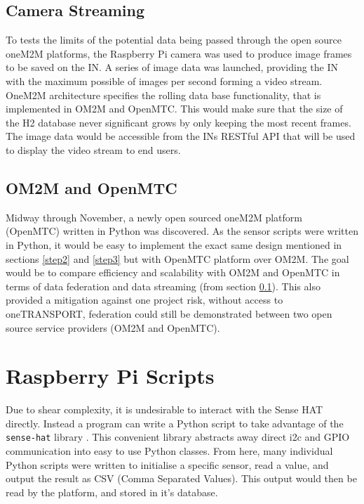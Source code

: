 \subsection{Camera Streaming}
\label{stream}

To tests the limits of the potential data being passed through the open source oneM2M platforms, the Raspberry Pi camera was used to produce image frames to be saved on the IN. A series of image data was launched, providing the IN with the maximum possible of images per second forming a video stream. OneM2M architecture specifies the rolling data base functionality, that is implemented in OM2M and OpenMTC. This would make sure that the size of the H2 database never significant grows by only keeping the most recent frames. The image data would be accessible from the INs RESTful API that will be used to display the video stream to end users.

\subsection{OM2M and OpenMTC}

Midway through November, a newly open sourced oneM2M platform (OpenMTC) written in Python was discovered. As the sensor scripts were written in Python, it would be easy to implement the exact same design mentioned in sections \ref{step2} and \ref{step3} but with OpenMTC platform over OM2M. The goal would be to compare efficiency and scalability with OM2M and OpenMTC in terms of data federation and data streaming (from section \ref{stream}). This also provided a mitigation against one project risk, without access to oneTRANSPORT, federation could still be demonstrated between two open source service providers (OM2M and OpenMTC).

\section{Raspberry Pi Scripts}

Due to shear complexity, it is undesirable to interact with the Sense HAT directly. Instead a program can write a Python script to take advantage of the \lstinline{sense-hat} library \cite{RaspberryPiFoundation2017SenseHAT}. This convenient library abstracts away direct i2c and GPIO communication into easy to use Python classes. From here, many individual Python scripts were written to initialise a specific sensor, read a value, and output the result as CSV (Comma Separated Values). This output would then be read by the platform, and stored in it's database.

